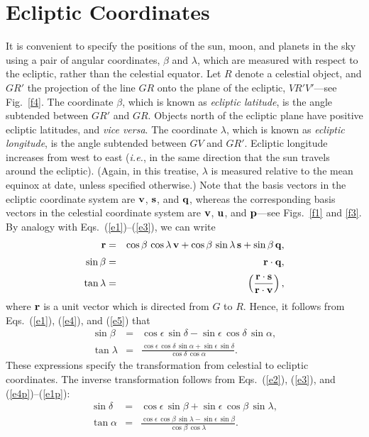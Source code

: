 \section{Ecliptic Coordinates}
It is convenient to specify the positions of the sun, moon, and planets in the sky using
a pair of angular coordinates, $\beta$ and $\lambda$, which are measured with respect to the
ecliptic, rather than the celestial equator. Let $R$ denote a celestial object, and $GR'$ the
projection of the line $GR$ onto the plane of the ecliptic, $VR'V'$---see Fig.~\ref{f4}. The coordinate $\beta$, which
is known as {\em ecliptic latitude}, is the angle subtended between $GR'$ and $GR$. Objects north
of the ecliptic plane have positive ecliptic latitudes, and {\em vice versa}. The coordinate $\lambda$,
which is known as {\em ecliptic longitude}, is the angle subtended between $GV$ and
$GR'$. Ecliptic longitude increases from west to east ({\em i.e.}, in the same direction that the sun travels
around the ecliptic). (Again, in this treatise, $\lambda$ is measured relative
to the mean equinox at date, unless specified otherwise.)
Note that the basis vectors in the ecliptic coordinate system are
${\bf v}$, ${\bf s}$, and ${\bf q}$, whereas the corresponding basis vectors in the
celestial coordinate system are
${\bf v}$, ${\bf u}$, and ${\bf p}$---see Figs.~\ref{f1} and \ref{f3}. By analogy with Eqs.~(\ref{e1})--(\ref{e3}), we can write
\begin{eqnarray}\label{e8w}
{\bf r} &=& \cos\beta\,\cos\lambda\,{\bf v} + \cos\beta\,\sin\lambda\,{\bf s} +\sin\beta\,{\bf q},\label{e1p}\\[0.5ex]
\sin\beta &=& {\bf r}\cdot {\bf q},\\[0.5ex]
\tan\lambda &=& \left(\frac{{\bf r}\cdot{\bf s}}{{\bf r}\cdot {\bf v}}\right),
\end{eqnarray}
where ${\bf r}$ is a unit vector which is directed from $G$ to $R$. 
Hence, it follows from Eqs.~(\ref{e1}), (\ref{e4}), and (\ref{e5}) that
\begin{eqnarray}
\sin\beta &=& \cos\epsilon\,\sin\delta - \sin\epsilon\,\cos\delta\,\sin\alpha,\\[0.5ex]
\tan\lambda &=& \frac{\cos\epsilon\,\cos\delta\,\sin\alpha+\sin\epsilon\,\sin\delta}{\cos\delta\,\cos\alpha}.
\end{eqnarray}
These expressions specify the transformation from celestial to ecliptic
coordinates. The inverse transformation follows from Eqs.~(\ref{e2}), (\ref{e3}), and (\ref{e4p})--(\ref{e1p}):
\begin{eqnarray}\label{e10}
\sin\delta &=& \cos\epsilon\,\sin\beta +\sin\epsilon\,\cos\beta\,\sin\lambda,\\[0.5ex]
\tan\alpha&=&  \frac{\cos\epsilon\,\cos\beta\,\sin\lambda-\sin\epsilon\,\sin\beta }{\cos\beta\,\cos\lambda}.\label{e11}
\end{eqnarray}

